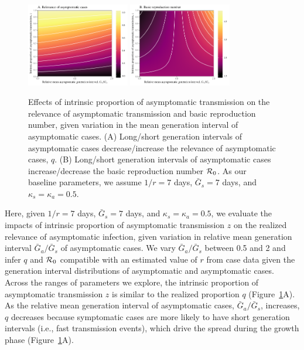 \begin{figure}[b!]
\begin{center}
\includegraphics[width=0.4\textwidth]{figheatmap.pdf}
\mbox{\hspace{0.05\textwidth}}
\includegraphics[width=0.4\textwidth]{figheatmap_R0.pdf}
\caption{Effects of intrinsic proportion of asymptomatic transmission on the relevance of asymptomatic transmission and basic reproduction number, given variation in
the mean generation interval of asymptomatic cases. 
(A) Long/short generation intervals of asymptomatic cases decrease/increase the relevance of asymptomatic cases, $q$.
(B) Long/short generation intervals of asymptomatic cases increase/decrease the basic reproduction number ${\cal{R}}_0$.
As our baseline parameters, we assume $1/r=7$ days, $\bar G_s=7$ days, and $\kappa_s=\kappa_a=0.5$.
\label{fig.relevance}}
\end{center}
\end{figure}

Here, given $1/r=7$ days, $\bar G_s=7$ days, and $\kappa_s=\kappa_a=0.5$, we evaluate the impacts of intrinsic proportion of asymptomatic transmission $z$ on the realized relevance of asymptomatic infection, given variation in relative mean generation interval $\bar G_a/\bar G_s$ of asymptomatic cases.
We vary $\bar G_a/\bar G_s$ between 0.5 and 2 and infer $q$ and ${\cal{R}}_0$ compatible with an estimated value of $r$ from case data given the generation interval distributions of asymptomatic and asymptomatic cases.
Across the ranges of parameters we explore, the intrinsic proportion of asymptomatic transmission $z$ is similar to the realized proportion $q$ (Figure~\ref{fig.relevance}A).
As the relative mean generation interval of asymptomatic cases, $\bar G_a/\bar G_s$, increases, $q$ decreases because symptomatic cases are more likely to have short generation intervals (i.e., fast transmission events), which drive the spread during the growth phase (Figure~\ref{fig.relevance}A).

